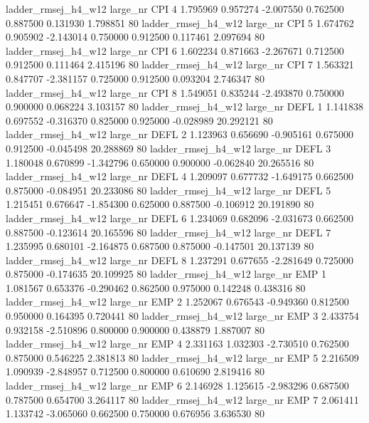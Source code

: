 ladder_rmsej_h4_w12   large_nr      CPI                 4  1.795969  0.957274  -2.007550 0.762500 0.887500  0.131930    1.798851 80
ladder_rmsej_h4_w12   large_nr      CPI                 5  1.674762  0.905902  -2.143014 0.750000 0.912500  0.117461    2.097694 80
ladder_rmsej_h4_w12   large_nr      CPI                 6  1.602234  0.871663  -2.267671 0.712500 0.912500  0.111464    2.415196 80
ladder_rmsej_h4_w12   large_nr      CPI                 7  1.563321  0.847707  -2.381157 0.725000 0.912500  0.093204    2.746347 80
ladder_rmsej_h4_w12   large_nr      CPI                 8  1.549051  0.835244  -2.493870 0.750000 0.900000  0.068224    3.103157 80
ladder_rmsej_h4_w12   large_nr     DEFL                 1  1.141838  0.697552  -0.316370 0.825000 0.925000 -0.028989   20.292121 80
ladder_rmsej_h4_w12   large_nr     DEFL                 2  1.123963  0.656690  -0.905161 0.675000 0.912500 -0.045498   20.288869 80
ladder_rmsej_h4_w12   large_nr     DEFL                 3  1.180048  0.670899  -1.342796 0.650000 0.900000 -0.062840   20.265516 80
ladder_rmsej_h4_w12   large_nr     DEFL                 4  1.209097  0.677732  -1.649175 0.662500 0.875000 -0.084951   20.233086 80
ladder_rmsej_h4_w12   large_nr     DEFL                 5  1.215451  0.676647  -1.854300 0.625000 0.887500 -0.106912   20.191890 80
ladder_rmsej_h4_w12   large_nr     DEFL                 6  1.234069  0.682096  -2.031673 0.662500 0.887500 -0.123614   20.165596 80
ladder_rmsej_h4_w12   large_nr     DEFL                 7  1.235995  0.680101  -2.164875 0.687500 0.875000 -0.147501   20.137139 80
ladder_rmsej_h4_w12   large_nr     DEFL                 8  1.237291  0.677655  -2.281649 0.725000 0.875000 -0.174635   20.109925 80
ladder_rmsej_h4_w12   large_nr      EMP                 1  1.081567  0.653376  -0.290462 0.862500 0.975000  0.142248    0.438316 80
ladder_rmsej_h4_w12   large_nr      EMP                 2  1.252067  0.676543  -0.949360 0.812500 0.950000  0.164395    0.720441 80
ladder_rmsej_h4_w12   large_nr      EMP                 3  2.433754  0.932158  -2.510896 0.800000 0.900000  0.438879    1.887007 80
ladder_rmsej_h4_w12   large_nr      EMP                 4  2.331163  1.032303  -2.730510 0.762500 0.875000  0.546225    2.381813 80
ladder_rmsej_h4_w12   large_nr      EMP                 5  2.216509  1.090939  -2.848957 0.712500 0.800000  0.610690    2.819416 80
ladder_rmsej_h4_w12   large_nr      EMP                 6  2.146928  1.125615  -2.983296 0.687500 0.787500  0.654700    3.264117 80
ladder_rmsej_h4_w12   large_nr      EMP                 7  2.061411  1.133742  -3.065060 0.662500 0.750000  0.676956    3.636530 80
